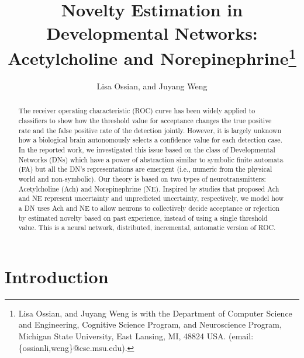 \documentclass[conference]{IEEEtran}
\begin{document}
\title{\ \\ \LARGE\bf Novelty Estimation in Developmental Networks: \\
Acetylcholine and Norepinephrine\thanks{Lisa Ossian, and Juyang Weng is with the Department of Computer Science and Engineering, Cognitive Science Program, and Neuroscience Program, 
Michigan State University, East Lansing, MI, 48824 USA. (email: \{ossianli,weng\}@cse.msu.edu).}}

\author{Lisa Ossian, and Juyang Weng}


\maketitle

\begin{abstract}
The receiver operating characteristic (ROC) 
curve has been widely applied to classifiers to show how the threshold value for acceptance changes the true positive rate and 
the false positive rate of the detection jointly.  However, it is largely unknown how a biological brain autonomously selects a confidence value for each detection case.  In the reported work, we investigated this issue based on the class of Developmental Networks (DNs) which have a power of
abstraction similar to symbolic finite automata (FA)
but all the DN's representations are emergent
(i.e., numeric from the physical world and non-symbolic).  Our theory is based on two types of neurotransmitters: Acetylcholine (Ach) and Norepinephrine (NE).  Inspired by studies that
proposed Ach and NE represent uncertainty and 
unpredicted uncertainty, respectively, we model how a DN uses 
Ach and NE to allow neurons to collectively decide acceptance or rejection by estimated 
novelty based on past experience, instead of using a single threshold value.   This is a neural network, 
distributed, incremental, automatic version of ROC. 
\end{abstract}


\section{Introduction}
\end{document}
